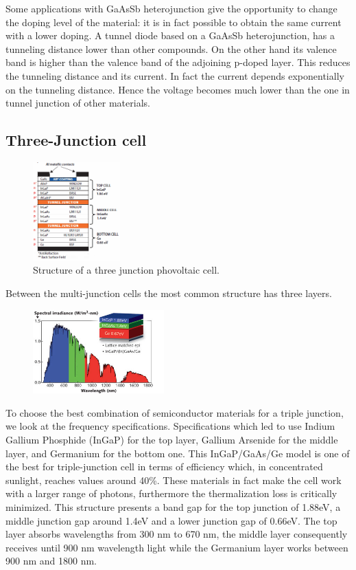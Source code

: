 \documentclass[11pt]{article} %
\begin{document}
Some applications with GaAsSb heterojunction give the opportunity to change the doping level of the material: it is in fact possible to obtain the same current with a lower doping. A tunnel diode based on a GaAsSb heterojunction, has a tunneling distance lower than other compounds. On the other hand its valence band is higher than the valence band of the adjoining p-doped layer. This reduces the tunneling distance and its current. In fact the current depends exponentially on the tunneling distance. Hence the voltage becomes much lower than the one in tunnel junction of other materials.  

\subsection{Three-Junction cell}

\begin{figure}
	\centering
	\includegraphics[width=0.3\textwidth]{img/f2big.png}
	\caption{Structure of a three junction phovoltaic cell.}
\end{figure}

Between the multi-junction cells the most common structure has three layers.  

\begin{figure}
	\centering
	\includegraphics[width=0.45\textwidth]{img/1212LFW04f2.jpg}
\end{figure}

To choose the best combination of semiconductor materials for a triple junction, we look at the frequency specifications. Specifications which led to use Indium Gallium Phosphide (InGaP) for the top layer, Gallium Arsenide for the middle layer, and Germanium for the bottom one. This InGaP/GaAs/Ge model is one of the best for triple-junction cell in terms of efficiency which, in concentrated sunlight, reaches values around 40\%. These materials in fact make the cell work with a larger range of photons, furthermore the thermalization loss is critically minimized. This structure presents a band gap for the top junction of 1.88eV, a middle junction gap around 1.4eV and a lower junction gap of 0.66eV. The top layer absorbs wavelengths from 300 nm to 670 nm, the middle layer consequently receives until 900 nm wavelength light while the Germanium layer works between 900 nm and 1800 nm. 
\end{document}
